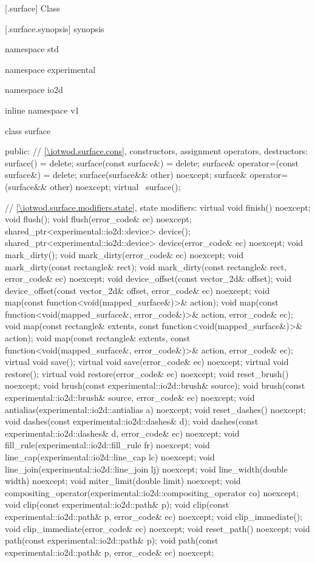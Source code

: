  [\iotwod.surface] {Class }

 [\iotwod.surface.synopsis] { synopsis}

\begin{codeblock}
namespace std { namespace experimental { namespace io2d { inline namespace v1 {
  class surface {
  public:
    // \ref{\iotwod.surface.cons}, constructors, assignment operators, destructors:
    surface() = delete;
    surface(const surface&) = delete;
    surface& operator=(const surface&) = delete;
    surface(surface&& other) noexcept;
    surface& operator=(surface&& other) noexcept;
    virtual ~surface();

    // \ref{\iotwod.surface.modifiers.state}, state modifiers:
    virtual void finish() noexcept;
    void flush();
    void flush(error_code& ec) noexcept;
    shared_ptr<experimental::io2d::device> device();
    shared_ptr<experimental::io2d::device> device(error_code& ec) noexcept;
    void mark_dirty();
    void mark_dirty(error_code& ec) noexcept;
    void mark_dirty(const rectangle& rect);
    void mark_dirty(const rectangle& rect, error_code& ec) noexcept;
    void device_offset(const vector_2d& offset);
    void device_offset(const vector_2d& offset, error_code& ec) noexcept;
    void map(const function<void(mapped_surface&)>& action);
    void map(const function<void(mapped_surface&, error_code&)>& action,
      error_code& ec);
    void map(const rectangle& extents,
      const function<void(mapped_surface&)>& action);
    void map(const rectangle& extents,
      const function<void(mapped_surface&, error_code&)>& action,
      error_code& ec);
    virtual void save();
    virtual void save(error_code& ec) noexcept;
    virtual void restore();
    virtual void restore(error_code& ec) noexcept;
    void reset_brush() noexcept;
    void brush(const experimental::io2d::brush& source);
    void brush(const experimental::io2d::brush& source, error_code& ec)
      noexcept;
    void antialias(experimental::io2d::antialias a) noexcept;
    void reset_dashes() noexcept;
    void dashes(const experimental::io2d::dashes& d);
    void dashes(const experimental::io2d::dashes& d, error_code& ec) noexcept;
    void fill_rule(experimental::io2d::fill_rule fr) noexcept;
    void line_cap(experimental::io2d::line_cap lc) noexcept;
    void line_join(experimental::io2d::line_join lj) noexcept;
    void line_width(double width) noexcept;
    void miter_limit(double limit) noexcept;
    void compositing_operator(experimental::io2d::compositing_operator co)
      noexcept;
    void clip(const experimental::io2d::path& p);
    void clip(const experimental::io2d::path& p, error_code& ec) noexcept;
    void clip_immediate();
    void clip_immediate(error_code& ec) noexcept;
    void reset_path() noexcept;
    void path(const experimental::io2d::path& p);
    void path(const experimental::io2d::path& p, error_code& ec) noexcept;

}}}}}
\end{codeblock}
